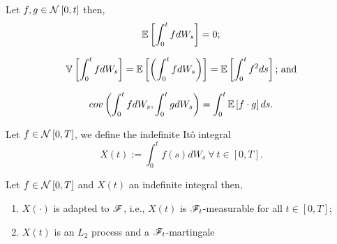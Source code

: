 \documentclass[../TGMAFFIRO.tex]{subfiles}
\begin{document}
\begin{proposition}
	Let $f, g \in \mathcal{N}\left[0, t\right]$ then,
	\begin{equation}
		\mathbb{E}\left[\int_0^t f dW_s\right] = 0;
	\end{equation}
	
	\begin{equation}
		\mathbb{V}\left[\int_0^t f dW_s\right] = \mathbb{E}\left[\left(\int_0^t f dW_s\right)\right] = \mathbb{E}\left[\int_0^t f^2 ds\right]\text{; and}
	\end{equation}
	
	\begin{equation}
		cov\left(\int_0^tfdW_s, \int_0^tgdW_s\right) = \int_0^t \mathbb{E}\left[f\cdot g\right] ds.
	\end{equation}
\end{proposition}

\begin{definition}
	Let $f\in \mathcal{N}\left[0, T\right]$, we define the indefinite It\^o integral
	\begin{equation}
		X(t) := \int_0^t f(s) dW_s \ \forall \ t\in[0, T].
	\end{equation}
\end{definition}

\begin{proposition}
	Let $f\in\mathcal{N}\left[0, T\right]$ and $X(t)$ an indefinite integral then,
	\begin{enumerate}
		\item $X(\cdot)$ is adapted to $\mathscr{F}$, i.e., $X(t)$ is $\mathscr{F}_t$-measurable for all $t\in[0, T]$; \label{it:adapted-int}
		\item $X(t)$ is an $L_2$ process and a $\mathscr{F}_t$-martingale \label{it:ito-martingale}
	\end{enumerate}
\end{proposition}
\end{document}
